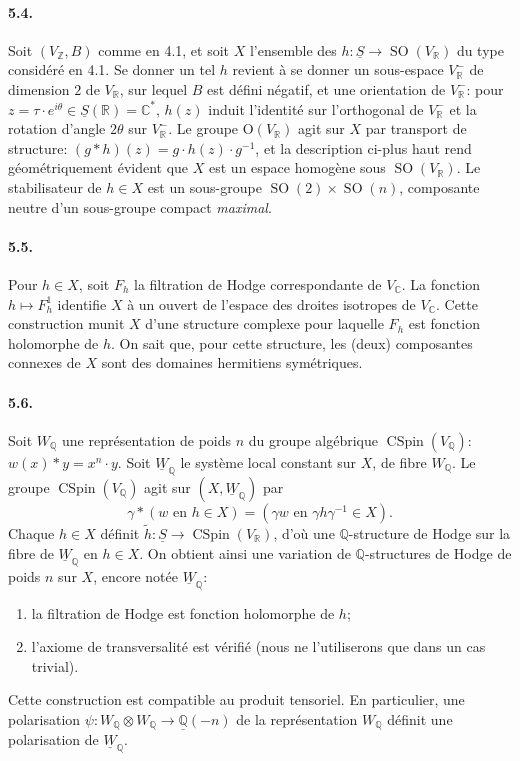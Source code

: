\documentclass[10pt,leqno]{article}
\newcommand{\C}{\mathbb{C}}
\newcommand{\Q}{\mathbb{Q}}
\newcommand{\R}{\mathbb{R}}
\newcommand{\Z}{\mathbb{Z}}
\newcommand{\SO}{\operatorname{SO}}
\newcommand{\CSpin}{\operatorname{CSpin}}
\begin{document}
\paragraph{5.4.} Soit $(V_\Z,B)$ comme en 4.1, et soit $X$ l'ensemble des $h:\underline S\to\SO(V_\R)$ du type considéré en 4.1. Se donner un tel $h$ revient à se donner un sous-espace $V^-_\R$ de dimension $2$ de $V_\R$, sur lequel $B$ est défini négatif, et une orientation de $V^-_\R$: pour $z=\tau\cdot e^{i\theta}\in\underline S(\R)=\C^*$, $h(z)$ induit l'identité sur l'orthogonal de $V^-_\R$ et la rotation d'angle $2\theta$ sur $V^-_\R$. Le groupe $\mathrm O(V_\R)$ agit sur $X$ par transport de structure: $(g*h)(z)=g\cdot h(z)\cdot g^{-1}$, et la description ci-plus haut rend géométriquement évident que $X$ est un espace homogène sous $\SO(V_\R)$. Le stabilisateur de $h\in X$ est un sous-groupe $\SO(2)\times\SO(n)$, composante neutre d'un sous-groupe compact \emph{maximal}.

\paragraph{5.5.} Pour $h\in X$, soit $F_h$ la filtration de Hodge correspondante de $V_\C$. La fonction $h\mapsto F_h^1$ identifie $X$ à un ouvert de l'espace des droites isotropes de $V_\C$. Cette construction munit $X$ d'une structure complexe pour laquelle $F_h$ est fonction holomorphe de $h$. On sait que, pour cette structure, les (deux) composantes connexes de $X$ sont des domaines hermitiens symétriques.

\paragraph{5.6.} Soit $W_\Q$ une représentation de poids $n$ du groupe algébrique $\CSpin(V_\Q)$: $w(x)*y=x^n\cdot y$. Soit $\underline W_\Q$ le système local constant sur $X$, de fibre $W_\Q$. Le groupe $\CSpin(V_\Q)$ agit sur $(X,\underline W_\Q)$ par
\[
\gamma*(w\text{ en }h\in X)=(\gamma w\text{ en }\gamma h\gamma^{-1}\in X).
\]
Chaque $h\in X$ définit $\tilde h:\underline S\to\CSpin(V_\R)$, d'où une $\Q$-structure de Hodge sur la fibre de $\underline W_\Q$ en $h\in X$. On obtient ainsi une variation de $\Q$-structures de Hodge de poids $n$ sur $X$, encore notée $\underline W_\Q$:
\begin{enumerate}[label=\alph*)]
\item la filtration de Hodge est fonction holomorphe de $h$;
\item l'axiome de transversalité est vérifié (nous ne l'utiliserons que dans un cas trivial).
\end{enumerate}
Cette construction est compatible au produit tensoriel. En particulier, une polarisation $\psi:W_\Q\otimes W_\Q\to\underline{\Q}(-n)$ de la représentation $W_\Q$ définit une polarisation de $\underline W_\Q$.
\end{document}

